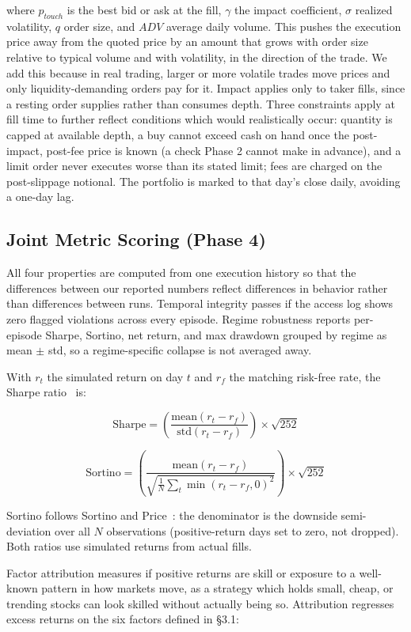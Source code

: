 \documentclass{article}
\begin{document}
where $p_{touch}$ is the best bid or ask at the fill, $\gamma$ the impact coefficient, $\sigma$ realized volatility, $q$ order size, and $ADV$ average daily volume. This pushes the execution price away from the quoted price by an amount that grows with order size relative to typical volume and with volatility, in the direction of the trade. We add this because in real trading, larger or more volatile trades move prices and only liquidity-demanding orders pay for it. Impact applies only to taker fills, since a resting order supplies rather than consumes depth. Three constraints apply at fill time to further reflect conditions which would realistically occur: quantity is capped at available depth, a buy cannot exceed cash on hand once the post-impact, post-fee price is known (a check Phase 2 cannot make in advance), and a limit order never executes worse than its stated limit; fees are charged on the post-slippage notional. The portfolio is marked to that day's close daily, avoiding a one-day lag.

\subsection{Joint Metric Scoring (Phase 4)}

All four properties are computed from one execution history so that the differences between our reported numbers reflect differences in behavior rather than differences between runs. Temporal integrity passes if the access log shows zero flagged violations across every episode. Regime robustness reports per-episode Sharpe, Sortino, net return, and max drawdown grouped by regime as mean $\pm$ std, so a regime-specific collapse is not averaged away.

With $r_t$ the simulated return on day $t$ and $r_f$ the matching risk-free rate, the Sharpe ratio~\cite{sharpe1966} is:

\[
\text{Sharpe} = \left(\frac{\text{mean}(r_t - r_f)}{\text{std}(r_t - r_f)}\right) \times \sqrt{252}
\]

\[
\text{Sortino} = \left(\frac{\text{mean}(r_t - r_f)}{\sqrt{\frac{1}{N}\sum_t \min(r_t - r_f, 0)^2}}\right) \times \sqrt{252}
\]

Sortino follows Sortino and Price~\cite{sortino1994}: the denominator is the downside semi-deviation over all $N$ observations (positive-return days set to zero, not dropped). Both ratios use simulated returns from actual fills.

Factor attribution measures if positive returns are skill or exposure to a well-known pattern in how markets move, as a strategy which holds small, cheap, or trending stocks can look skilled without actually being so. Attribution regresses excess returns on the six factors defined in \S3.1:
\end{document}
